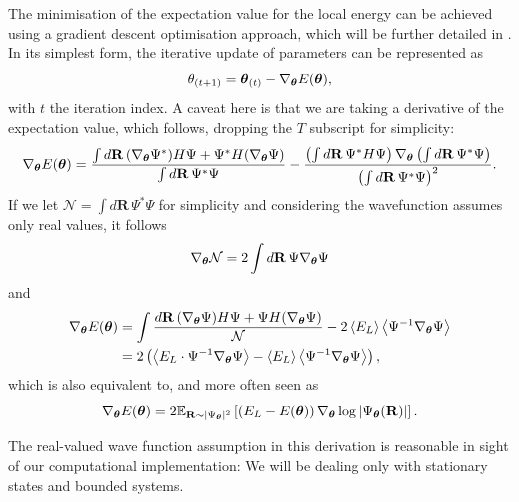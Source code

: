 The minimisation of the expectation value for the local energy can be achieved using a gradient descent optimisation approach, which will be further detailed in . In its simplest form, the iterative update of parameters can be represented as
\begin{equation}
    \theta_{(t+1)} = \boldsymbol{\theta}_{(t)} - \nabla_{\boldsymbol{\theta}} E(\boldsymbol{\theta}),
\end{equation}
with $t$ the iteration index. A caveat here is that we are taking a derivative of the expectation value, which follows, dropping the $T$ subscript for simplicity:
\begin{align*}
    \nabla_{\boldsymbol{\theta}} E(\boldsymbol{\theta})= 
\frac{\int d\mathbf{R}\, (\nabla_{\boldsymbol{\theta}}\Psi^*) H \Psi + \Psi^* H(\nabla_{\boldsymbol{\theta}}\Psi)}{\int d\mathbf{R}\, \Psi^* \Psi }
- \frac{\left(\int d\mathbf{R}\, \Psi^* H \Psi\right) \nabla_{\boldsymbol{\theta}} \left(\int d\mathbf{R}\, \Psi^* \Psi \right)}{\left(\int d\mathbf{R}\, \Psi^* \Psi \right)^2}.\\
\end{align*}
If we let $\mathcal{N} = \int d\mathbf{R}\, \Psi^* \Psi $ for simplicity and considering the wavefunction assumes only real values, it follows
\begin{align*}
    \nabla_{\boldsymbol{\theta}} \mathcal{N} = 2 \int d\mathbf{R}\, \Psi \nabla_{\boldsymbol{\theta}}\Psi 
\end{align*}
and
\begin{align*}
\nabla_{\boldsymbol{\theta}} E(\boldsymbol{\theta}) &= \int \frac{d\mathbf{R}\, (\nabla_{\boldsymbol{\theta}}\Psi) H \Psi + \Psi H(\nabla_{\boldsymbol{\theta}}\Psi)}{\mathcal{N} }
- 2\left\langle E_L\right\rangle\left\langle\Psi^{-1}\nabla_{\boldsymbol{\theta}}\Psi\right\rangle\\
&=2\left(\left\langle E_L \cdot\Psi^{-1}\nabla_{\boldsymbol{\theta}}\Psi\right\rangle-\left\langle E_L\right\rangle\left\langle\Psi^{-1}\nabla_{\boldsymbol{\theta}}\Psi\right\rangle\right),\\
\end{align*}
which is also equivalent to, and more often seen as 
\begin{equation}
    \nabla_{\boldsymbol{\theta}} E(\boldsymbol{\theta})=2 \mathbb{E}_{\mathbf{R}\sim |\Psi_{\boldsymbol{\theta}}|^2}\left[ \left(E_L
- E(\boldsymbol{\theta})\right)\nabla_{\boldsymbol{\theta}}\log \left|\Psi_{\boldsymbol{\theta}} (\mathbf{R})\right|\right].
\label{eq:grad_el_vmc2}
\end{equation}

The real-valued wave function assumption in this derivation is reasonable in sight of our computational implementation: We will be dealing only with stationary states and bounded systems.

